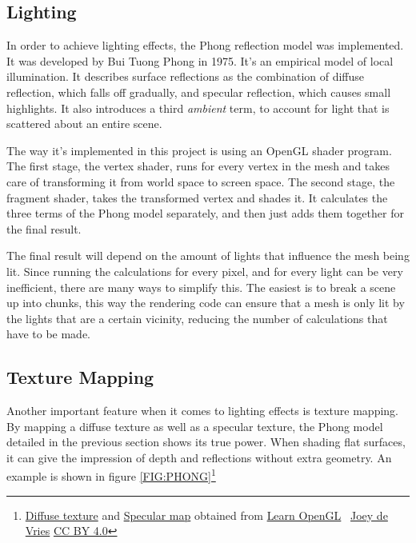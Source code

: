 
\subsection{Lighting}


In order to achieve lighting effects,
the Phong reflection model was implemented.
It was developed by Bui Tuong Phong in 1975\cite{phong}.
It's an empirical model of local illumination.
It describes surface reflections as the combination of diffuse reflection,
which falls off gradually,
and specular reflection,
which causes small highlights.
It also introduces a third \textit{ambient} term,
to account for light that is scattered about an entire scene.

The way it's implemented in this project is using an OpenGL shader program.
The first stage, the vertex shader,
runs for every vertex in the mesh and takes care of transforming it from world space to screen space.
The second stage, the fragment shader,
takes the transformed vertex and shades it.
It calculates the three terms of the Phong model separately,
and then just adds them together for the final result.

The final result will depend on the amount of lights that influence the mesh being lit.
Since running the calculations for every pixel,
and for every light can be very inefficient,
there are many ways to simplify this.
The easiest is to break a scene up into chunks,
this way the rendering code can ensure that a mesh is only lit by the lights that are a certain vicinity,
reducing the number of calculations that have to be made.

\subsection{Texture Mapping}


Another important feature when it comes to lighting effects is texture mapping.
By mapping a diffuse texture as well as a specular texture,
the Phong model detailed in the previous section shows its true power.
When shading flat surfaces,
it can give the impression of depth and reflections without extra geometry.
An example is shown in figure \ref{FIG:PHONG}\footnote{
\href{https://learnopengl.com/img/textures/container2.png}{Diffuse texture} and
\href{https://learnopengl.com/img/textures/container2_specular.png}{Specular map} obtained from
\href{https://learnopengl.com/Lighting/Lighting-maps}{Learn OpenGL}
\textcopyright\,
\href{https://twitter.com/JoeyDeVriez}{Joey de Vries}
\href{https://creativecommons.org/licenses/by/4.0/legalcode}{CC BY 4.0} }

